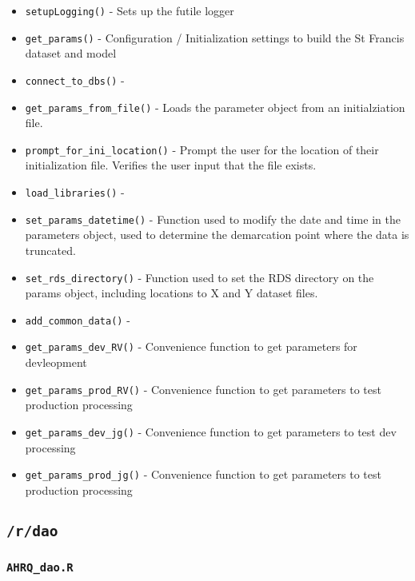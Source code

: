 \documentclass[
]{book}
\providecommand{\tightlist}{%
  \setlength{\itemsep}{0pt}\setlength{\parskip}{0pt}}
\begin{document}
\begin{itemize}
\tightlist
\item
  \texttt{setupLogging()} - Sets up the futile logger
\item
  \texttt{get\_params()} - Configuration / Initialization settings to build the St Francis dataset and model
\item
  \texttt{connect\_to\_dbs()} -
\item
  \texttt{get\_params\_from\_file()} - Loads the parameter object from an initialziation file.
\item
  \texttt{prompt\_for\_ini\_location()} - Prompt the user for the location of their initialization file. Verifies the user input that the file exists.
\item
  \texttt{load\_libraries()} -
\item
  \texttt{set\_params\_datetime()} - Function used to modify the date and time in the parameters object, used to determine the demarcation point where the data is truncated.
\item
  \texttt{set\_rds\_directory()} - Function used to set the RDS directory on the params object, including locations to X and Y dataset files.
\item
  \texttt{add\_common\_data()} -
\item
  \texttt{get\_params\_dev\_RV()} - Convenience function to get parameters for devleopment
\item
  \texttt{get\_params\_prod\_RV()} - Convenience function to get parameters to test production processing
\item
  \texttt{get\_params\_dev\_jg()} - Convenience function to get parameters to test dev processing
\item
  \texttt{get\_params\_prod\_jg()} - Convenience function to get parameters to test production processing
\end{itemize}

\hypertarget{rdao-1}{%
\subsection{\texorpdfstring{\texttt{/r/dao}}{/r/dao}}\label{rdao-1}}

\hypertarget{ahrq_dao.r}{%
\subsubsection{\texorpdfstring{\texttt{AHRQ\_dao.R}}{AHRQ\_dao.R}}\label{ahrq_dao.r}}
\end{document}
